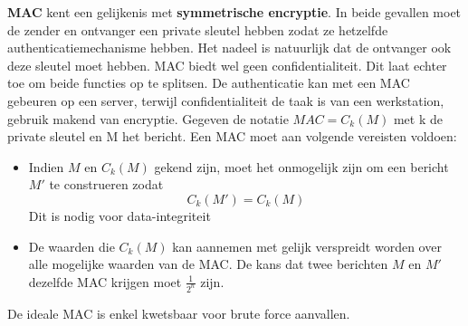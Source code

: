 \documentclass{report}
\begin{document}
\begin{itemize}
	\textbf{MAC} kent een gelijkenis met \textbf{symmetrische encryptie}. In beide gevallen moet de zender en ontvanger een private sleutel hebben zodat ze hetzelfde authenticatiemechanisme hebben. Het nadeel is natuurlijk dat de ontvanger ook deze sleutel moet hebben. MAC biedt wel geen confidentialiteit. Dit laat echter toe om beide functies op te splitsen. De authenticatie kan met een MAC gebeuren op een server, terwijl confidentialiteit de taak is van een werkstation, gebruik makend van encryptie. Gegeven de notatie \textbf{$MAC = C_k(M)$} met k de private sleutel en M het bericht. Een MAC moet aan volgende vereisten voldoen:
	\begin{itemize}
		\item Indien $M$ en $C_k(M)$ gekend zijn, moet het onmogelijk zijn om een bericht $M'$ te construeren zodat \textbf{$$C_k(M') = C_k(M)$$} Dit is nodig voor data-integriteit
		
		\item De waarden die $C_k(M)$ kan aannemen met gelijk verspreidt worden over alle mogelijke waarden van de MAC. De kans dat twee berichten $M$ en $M'$ dezelfde MAC krijgen moet $\frac{1}{2^n}$ zijn.
	\end{itemize}

De ideale MAC is enkel kwetsbaar voor brute force aanvallen. 

	\end{itemize}
\end{document}
